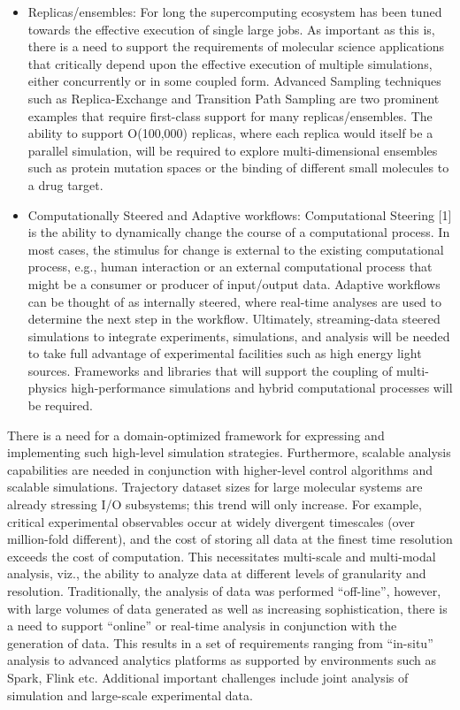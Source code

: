 \documentclass[10pt,letterpaper,draft]{article}
\begin{document}
\begin{itemize}
\item Replicas/ensembles: For long the supercomputing ecosystem has been tuned
  towards the effective execution of single large jobs. As important as this is,
  there is a need to support the requirements of molecular science applications
  that critically depend upon the effective execution of multiple simulations,
  either concurrently or in some coupled form. Advanced Sampling techniques such
  as Replica-Exchange and Transition Path Sampling are two prominent examples
  that require first-class support for many replicas/ensembles. The ability to
  support O(100,000) replicas, where each replica would itself be a parallel
  simulation, will be required to explore multi-dimensional ensembles such as
  protein mutation spaces or the binding of different small molecules to a drug
  target.

\item Computationally Steered and Adaptive workflows: Computational Steering [1]
  is the ability to dynamically change the course of a computational process. In
  most cases, the stimulus for change is external to the existing computational
  process, e.g., human interaction or an external computational process that
  might be a consumer or producer of input/output data.  Adaptive workflows can
  be thought of as internally steered, where real-time analyses are used to
  determine the next step in the workflow. Ultimately, streaming-data steered
  simulations to integrate experiments, simulations, and analysis will be needed
  to take full advantage of experimental facilities such as high energy light
  sources. Frameworks and libraries that will support the coupling of
  multi-physics high-performance simulations and hybrid computational processes
  will be required.

\end{itemize}

There is a need for a domain-optimized framework for expressing and implementing
such high-level simulation strategies. Furthermore, scalable analysis
capabilities are needed in conjunction with higher-level control algorithms and
scalable simulations. Trajectory dataset sizes for large molecular systems are
already stressing I/O subsystems; this trend will only increase. For example,
critical experimental observables occur at widely divergent timescales (over
million-fold different), and the cost of storing all data at the finest time
resolution exceeds the cost of computation.  This necessitates multi-scale and
multi-modal analysis, viz., the ability to analyze data at different levels of
granularity and resolution. Traditionally, the analysis of data was performed
“off-line”, however, with large volumes of data generated as well as increasing
sophistication, there is a need to support “online” or real-time analysis in
conjunction with the generation of data. This results in a set of requirements
ranging from “in-situ” analysis to advanced analytics platforms as supported by
environments such as Spark, Flink etc.  Additional important challenges include
joint analysis of simulation and large-scale experimental data.
\end{document}
